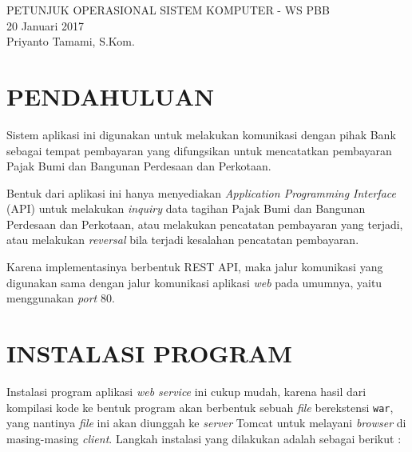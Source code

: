 \documentclass[pdftex,12pt, oneside]{article}
\begin{document}
\sloppy %

\begin{center}
{\large PETUNJUK OPERASIONAL SISTEM KOMPUTER - WS PBB}
\\[1cm]
20 Januari 2017\\
Priyanto Tamami, S.Kom.
\end{center}




\section{PENDAHULUAN}

Sistem aplikasi ini digunakan untuk melakukan komunikasi dengan pihak Bank sebagai tempat pembayaran yang difungsikan untuk mencatatkan pembayaran Pajak Bumi dan Bangunan Perdesaan dan Perkotaan. 

Bentuk dari aplikasi ini hanya menyediakan \textit{Application Programming Interface} (API) untuk melakukan \textit{inquiry} data tagihan Pajak Bumi dan Bangunan Perdesaan dan Perkotaan, atau melakukan pencatatan pembayaran yang terjadi, atau melakukan \textit{reversal} bila terjadi kesalahan pencatatan pembayaran.

Karena implementasinya berbentuk REST API, maka jalur komunikasi yang digunakan sama dengan jalur komunikasi aplikasi \textit{web} pada umumnya, yaitu menggunakan \textit{port} 80.

\section{INSTALASI PROGRAM}

Instalasi program aplikasi \textit{web service} ini cukup mudah, karena hasil dari kompilasi kode ke bentuk program akan berbentuk sebuah \textit{file} berekstensi \texttt{war}, yang nantinya \textit{file} ini akan diunggah ke \textit{server} Tomcat untuk melayani \textit{browser} di masing-masing \textit{client}. Langkah instalasi yang dilakukan adalah sebagai berikut :
\end{document}
